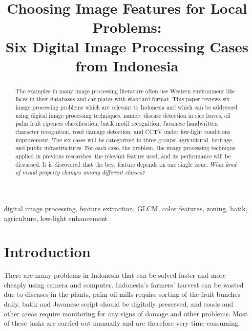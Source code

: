 \documentclass[conference]{IEEEtran}
\begin{document}
\title{Choosing Image Features for Local Problems:\\ Six Digital Image Processing Cases from Indonesia}

\author{
}

\maketitle

\begin{abstract}
The examples in many image processing literature often use Western environment like faces in their databases and car plates with standard format. This paper reviews six image processing problems which are relevant to Indonesia and which can be addressed using digital image processing techniques, namely disease detection in rice leaves, oil palm fruit ripeness classification, batik motif recognition, Javanese handwritten character recognition, road damage detection, and CCTV under low-light conditions improvement. The six cases will be categorized in three groups: agricultural, heritage, and public infrastructures. For each case, the problem, the image processing technique applied in previous researches, the relevant feature used, and its performance will be discussed. It is discovered that the best feature depends on one single issue: \emph{What kind of visual property changes among different classes?}
\end{abstract}

\begin{IEEEkeywords}
digital image processing, feature extraction, GLCM, color features, zoning, batik, agriculture, low-light enhancement
\end{IEEEkeywords}

\section{Introduction}
    There are many problems in Indonesia that can be solved faster and more cheaply using camera and computer. Indonesia's farmers' harvest can be wasted due to diseases in the plants, palm oil mills require sorting of the fruit bunches daily, batik and Javanese script should be digitally preserved, and roads and other areas require monitoring for any signs of damage and other problems. Most of these tasks are carried out manually and are therefore very time-consuming.
\end{document}
